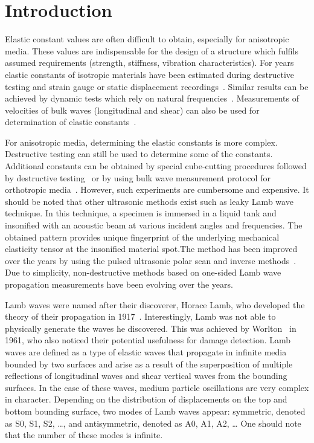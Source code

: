 \documentclass[preprint,12pt]{elsarticle}
\begin{document}
	
	\section{Introduction}
	Elastic constant values are often difficult to obtain, especially for anisotropic media. These values are indispensable for the design of a structure which fulfils assumed requirements (strength, stiffness, vibration characteristics). For years elastic constants of isotropic materials have been estimated during destructive testing and strain gauge or static displacement recordings~\cite{Wang2000}. Similar results can be achieved by dynamic tests which rely on natural frequencies~\cite{Wang2000a, Wesolowski2009,Beluch2014}. Measurements of velocities of bulk waves (longitudinal and shear) can also be used for determination of elastic constants~\cite{Rose1999}.
	
	For anisotropic media, determining the elastic constants is more complex. Destructive testing can still be used to determine some of the constants. Additional constants can be obtained by special cube-cutting procedures followed by destructive testing~\cite{Rose1991} or by using bulk wave measurement protocol for orthotropic media~\cite{Rose1999}. However, such experiments are cumbersome and expensive.  It should be noted that other ultrasonic methods exist such as leaky Lamb wave technique. In this technique, a specimen is immersed in a liquid tank and insonified with an acoustic beam at various incident angles and frequencies. The obtained pattern provides unique fingerprint of the underlying mechanical elasticity tensor at the insonified material spot.The method has been improved over the years by using the pulsed ultrasonic polar scan and inverse methods~\cite{Kersemans2014}. Due to simplicity, non-destructive methods based on one-sided Lamb wave propagation measurements have been evolving over the years.
	
	Lamb waves were named after their discoverer, Horace Lamb, who developed the theory of their propagation in 1917~\cite{Lamb1917}. Interestingly, Lamb was not able to physically generate the waves he discovered. This was achieved by Worlton~\cite{Worlton1961} in 1961, who also noticed their potential usefulness for damage detection. Lamb waves are defined as a type of elastic waves that propagate in infinite media bounded by two surfaces and arise as a result of the superposition of multiple reflections of longitudinal waves and shear vertical waves from the bounding surfaces. In the case of these waves, medium particle oscillations are very complex in character. Depending on the distribution of displacements on the top and bottom bounding surface, two modes of Lamb waves appear: symmetric, denoted as S0, S1, S2, …, and antisymmetric, denoted as A0, A1, A2, … One should note that the number of these modes is infinite.
	
\end{document}
